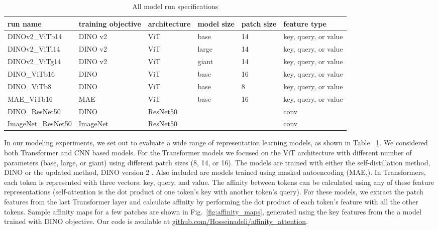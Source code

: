 \documentclass{article}
\begin{document}
\begin{table}[h]
\caption{All model run specifications}
\label{tab:all_runs}
    \centering
\def\arraystretch{1.6}
\begin{tabular}{|p{3cm}||p{1.4cm}|p{1.7cm}|p{}|p{1cm}|p{3cm}| }
 \hline
  run name & training objective  & architecture & model size & patch size & feature type \\
 \hline
 DINOv2\_ViTb14 & DINO v2& ViT & base & 14 & key, query, or value\\
 \hline
 DINOv2\_ViTl14 & DINO v2& ViT & large & 14 & key, query, or value\\
 \hline
 DINOv2\_ViTg14 & DINO v2& ViT & giant & 14 & key, query, or value\\
 \hline
 DINO\_ViTb16 & DINO & ViT & base & 16 & key, query, or value\\
 \hline
 DINO\_ViTb8 & DINO & ViT & base & 8 & key, query, or value\\
 \hline
 MAE\_ViTb16 & MAE & ViT & base & 16 & key, query, or value\\
 \hline
 DINO\_ResNet50 & DINO & ResNet50 & & & conv\\
 \hline
 ImageNet\_ResNet50 & ImageNet & ResNet50 &  &  & conv\\
 \hline
\end{tabular}
    \centering
\end{table}

In our modeling experiments, we set out to evaluate a wide range of representation learning models, as shown in Table ~\ref{tab:all_runs}. We considered both Transformer and CNN based models. For the Transformer models we focused on the ViT architecture \citep{dosovitskiy2020image} with different number of parameters (base, large, or giant) using different patch sizes (8, 14, or 16). The models are trained with either the self-distillation method, DINO \citep{caron2021emerging} or the updated method, DINO version 2 \citep{oquab2023dinov2}. Also included are models trained using masked autoencoding (MAE,\citep{he2022masked}). In Transformers, each token is represented with three vectors: key, query, and value. The affinity between tokens can be calculated using any of these feature representations (self-attention is the dot product of one token's key with another token's query). For these models, we extract the patch features from the last Transformer layer and calculate affinity by performing the dot product of each token's feature with all the other tokens. Sample affinity maps for a few patches are shown in Fig.~\ref{fig:affinity_maps}, generated using the key features from the a model trained with DINO objective. Our code is available at \href{https://github.com/Hosseinadeli/affinity_attention}{github.com/Hosseinadeli/affinity\_attention}.
\end{document}

